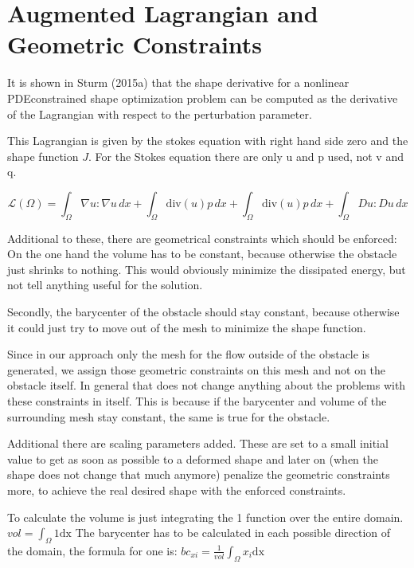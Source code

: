 \section{Augmented Lagrangian and Geometric Constraints}

It is shown in Sturm (2015a) that the shape derivative for a nonlinear PDEconstrained shape optimization problem can be computed as the derivative of the Lagrangian with respect to the perturbation parameter.\cite{fully_semi_paper_sturm}

This Lagrangian is given by the stokes equation with right hand side zero and the shape function $J$.
For the Stokes equation there are only u and p used, not v and q.

\begin{equation}\label{eq:lagrangian_basic}
    \mathcal{L}(\Omega) = \int_{\Omega} \nabla u : \nabla u \, dx + \int_{\Omega} \mathrm{div}(u)p \, dx + \int_{\Omega} \mathrm{div}(u)p \, dx + \int_{\Omega} Du : Du \, dx
\end{equation}

Additional to these, there are geometrical constraints which should be enforced: On the one hand the volume has to be constant, because otherwise the obstacle just shrinks to nothing. This would obviously minimize the dissipated energy, but not tell anything useful for the solution.

Secondly, the barycenter of the obstacle should stay constant, because otherwise it could just try to move out of the mesh to minimize the shape function.

Since in our approach only the mesh for the flow outside of the obstacle is generated, we assign those geometric constraints on this mesh and not on the obstacle itself. In general that does not change anything about the problems with these constraints in itself. This is because if the barycenter and volume of the surrounding mesh stay constant, the same is true for the obstacle.

Additional there are scaling parameters added. These are set to a small initial value to get as soon as possible to a deformed shape and later on (when the shape does not change that much anymore) penalize the geometric constraints more, to achieve the real desired shape with the enforced constraints.

To calculate the volume is just integrating the 1 function over the entire domain. $vol = \int_\Omega 1 \mathrm{dx}$
The barycenter has to be calculated in each possible direction of the domain, the formula for one is: $bc_{xi} = \frac{1}{vol}\int_\Omega x_i \mathrm{dx}$

